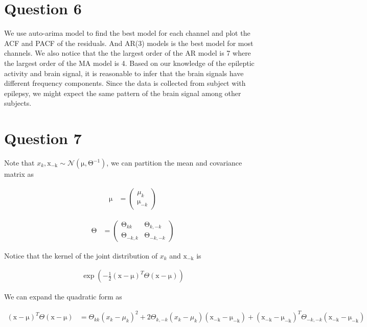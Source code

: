 \documentclass{article}
\newcommand{\vect}[1]{\boldsymbol{\mathrm{#1}}}
\begin{document}
\section*{Question 6}

We use auto-arima model to find the best model for each channel and plot the ACF and PACF of the residuals. And AR(3) models is the best model for most channels. We also notice that the the largest order of the AR model is 7 where the largest order of the MA model is 4. Based on our knowledge of the epileptic activity and brain signal, it is reasonable to infer that the brain signals have different frequency components. Since the data is collected from subject with epilepsy, we might expect the same pattern of the brain signal among other subjects.

\section*{Question 7}

Note that \(x_k, \vect{x_{-k}} \sim \mathcal{N}(\vect \mu, \vect \Theta^{-1})\), we can partition the mean and covariance matrix as

\begin{align*}
  \vect \mu &= \begin{pmatrix}
    \mu_k \\
    \vect \mu_{-k}
  \end{pmatrix}
\end{align*}

\begin{align*}
  \vect{\Theta} &= \begin{pmatrix}
    \vect \Theta_{kk} & \vect \Theta_{k,-k} \\
    \vect \Theta_{-k,k} & \vect \Theta_{-k,-k}
  \end{pmatrix}
\end{align*}

Notice that the kernel of the joint distribution of \(x_k\) and \(\vect{x_{-k}}\) is

\begin{align*}
\exp \left( - \frac{1}{2} (\vect x - \vect \mu)^T\Theta (\vect x - \vect \mu) \right)
\end{align*}

We can expand the quadratic form as

\begin{align*}
  (\vect x - \vect \mu)^T\Theta (\vect x - \vect \mu) &= \Theta_{kk}(x_k - \mu_k)^2 + 2 \Theta_{k,-k}(x_k - \mu_k)(\vect{x_{-k}} - \vect{\mu_{-k}}) + (\vect{x_{-k}} - \vect{\mu_{-k}})^T\Theta_{-k,-k}(\vect{x_{-k}} - \vect{\mu_{-k}})
\end{align*}
\end{document}
